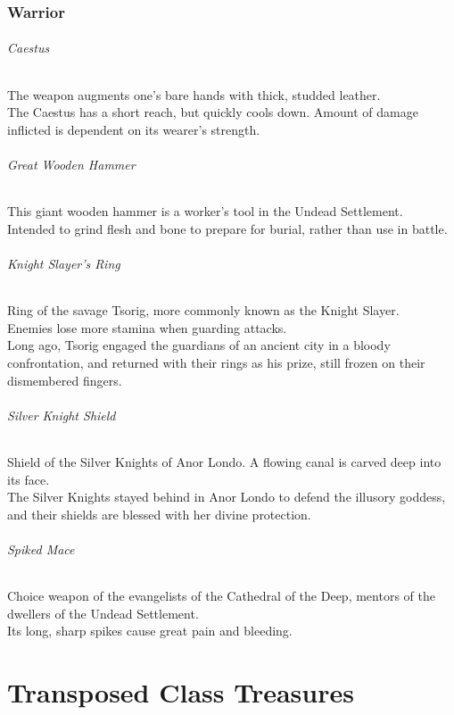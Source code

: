 \documentclass[twocolumn,a4paper]{article}
\begin{document}
\section*{Warrior}
\paragraph{Caestus}
The weapon augments one's bare hands with thick, studded leather.\\
The Caestus has a short reach, but quickly cools down. Amount of damage inflicted is dependent on its wearer's strength.
\paragraph{Great Wooden Hammer}
This giant wooden hammer is a worker's tool in the Undead Settlement.\\
Intended to grind flesh and bone to prepare for burial, rather than use in battle.
\paragraph{Knight Slayer's Ring}
Ring of the savage Tsorig, more commonly known as the Knight Slayer.\\
Enemies lose more stamina when guarding attacks.\\
Long ago, Tsorig engaged the guardians of an ancient city in a bloody confrontation, and returned with their rings as his prize, still frozen on their dismembered fingers.
\pagebreak %
\paragraph{Silver Knight Shield}
Shield of the Silver Knights of Anor Londo. A flowing canal is carved deep into its face.\\
The Silver Knights stayed behind in Anor Londo to defend the illusory goddess, and their shields are blessed with her divine protection.
\paragraph{Spiked Mace}
Choice weapon of the evangelists of the Cathedral of the Deep, mentors of the dwellers of the Undead Settlement.\\
Its long, sharp spikes cause great pain and bleeding.

\newpage
\part{Transposed Class Treasures}
\end{document}
